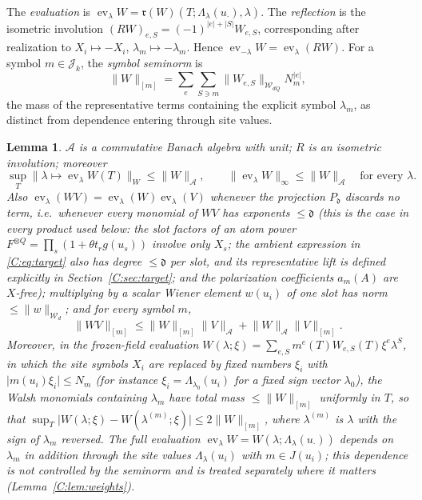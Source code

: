 \documentclass[11pt]{article}
\newtheorem{lemma}[lemma]{Lemma}
\DeclareMathOperator{\ev}{ev}
\newcommand{\cW}{\mathcal{W}}
\newcommand{\cA}{\mathcal{A}}
\newcommand{\cJ}{\mathcal{J}}
\newcommand{\norm}[1]{\lVert #1\rVert}
\newcommand{\abs}[1]{\lvert #1\rvert}
\newcommand{\dg}{\mathfrak{d}}
\newcommand{\realize}{\mathfrak r}
\begin{document}
The \emph{evaluation} is
\(\ev_\lambda W=\realize(W)(T;\Lambda_\lambda(u_\cdot),\lambda)\).
The \emph{reflection} is the isometric involution
\((RW)_{e,S}=(-1)^{\abs e+\abs S}W_{e,S}\), corresponding after realization
to \(X_i\mapsto-X_i\), \(\lambda_m\mapsto-\lambda_m\).  Hence
\(\ev_{-\lambda}W=\ev_\lambda(RW)\).  For a symbol \(m\in\cJ_k\), the
\emph{symbol seminorm} is
\begin{equation}
 \norm W_{[m]}=\sum_e\sum_{S\ni m}
       \norm{W_{e,S}}_{\cW_{dQ}}N_m^{\abs e},
 \label{C:eq:symbol-seminorm}
\end{equation}
the mass of the representative terms containing the explicit symbol
\(\lambda_m\), as distinct from dependence entering through site values.

\begin{lemma}\label{C:lem:algebra}
\(\cA\) is a commutative Banach algebra with unit; \(R\) is an isometric
involution; moreover
\[
 \sup_T\norm{\lambda\mapsto\ev_\lambda W(T)}_W\le\norm W_\cA,
 \qquad \norm{\ev_\lambda W}_\infty\le\norm W_\cA
 \quad\text{for every }\lambda.
\]
Also \(\ev_\lambda(WV)=\ev_\lambda(W)\ev_\lambda(V)\) whenever the
projection \(P_\dg\) discards no term, i.e.\ whenever every monomial of
\(WV\) has exponents \(\le\dg\) (this is the case in every product used
below: the slot factors of an atom power
\(F^{\otimes Q}=\prod_s(1+\theta t_rg(u_s))\) involve only \(X_s\);
the ambient expression in \eqref{C:eq:target} also has degree
\(\le\dg\) per slot, and its representative lift is defined explicitly in
Section~\ref{C:sec:target}; and the
polarization coefficients \(a_m(A)\) are \(X\)-free); multiplying by a
scalar Wiener element \(w(u_i)\) of one slot has norm
\(\le\norm w_{\cW_d}\); and for every symbol \(m\),
\[
 \norm{WV}_{[m]}\le\norm W_{[m]}\norm V_\cA+\norm W_\cA\norm V_{[m]} .
\]
Moreover, in the \emph{frozen-field evaluation}
\(W(\lambda;\xi)=\sum_{e,S}m^e(T)W_{e,S}(T)\xi^e\lambda^S\), in which the site
symbols \(X_i\) are replaced by fixed numbers \(\xi_i\) with
\(\abs{m(u_i)\xi_i}\le N_m\) (for instance \(\xi_i=\Lambda_{\lambda_0}(u_i)\) for
a fixed sign vector \(\lambda_0\)), the Walsh monomials containing
\(\lambda_m\) have total mass \(\le\norm W_{[m]}\) uniformly in \(T\), so
that \(\sup_T\abs{W(\lambda;\xi)-W(\lambda^{(m)};\xi)}\le2\norm W_{[m]}\),
where \(\lambda^{(m)}\) is \(\lambda\) with the sign of \(\lambda_m\) reversed.
The full evaluation \(\ev_\lambda W=W(\lambda;\Lambda_\lambda(u_\cdot))\)
depends on \(\lambda_m\) in addition through the site values
\(\Lambda_\lambda(u_i)\) with \(m\in J(u_i)\); this dependence is not
controlled by the seminorm and is treated separately where it matters
(Lemma~\ref{C:lem:weights}).
\end{lemma}
\end{document}
